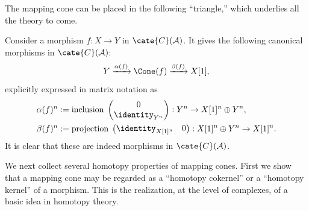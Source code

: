 The mapping cone can be placed in the following ``triangle,'' which underlies
all the theory to come.

\begin{definition}\label{def:cone-triangle}
	Consider a morphism $f:X\to Y$ in $\cate{C}(\mathcal{A})$. It gives the
	following canonical morphisms in $\cate{C}(\mathcal{A})$:
	\[ Y \xrightarrow{\alpha(f)} \Cone(f) \xrightarrow{\beta(f)} X[1] , \]
	explicitly expressed in matrix notation as
	\begin{align*}
		\alpha(f)^n & := \text{inclusion}\; \begin{pmatrix} 0 \\ \identity_{Y^n} \end{pmatrix}: Y^n \to X[1]^n \oplus Y^n , \\
		\beta(f)^n & := \text{projection}\; \begin{pmatrix} \identity_{X[1]^n} & 0 \end{pmatrix}: X[1]^n \oplus Y^n \to X[1]^n .
	\end{align*}
	It is clear that these are indeed morphisms in $\cate{C}(\mathcal{A})$.
\end{definition}

We next collect several homotopy properties of mapping cones. First we show
that a mapping cone may be regarded as a ``homotopy cokernel'' or a
``homotopy kernel'' of a morphism. This is the realization, at the level of
complexes, of a basic idea in homotopy theory.

